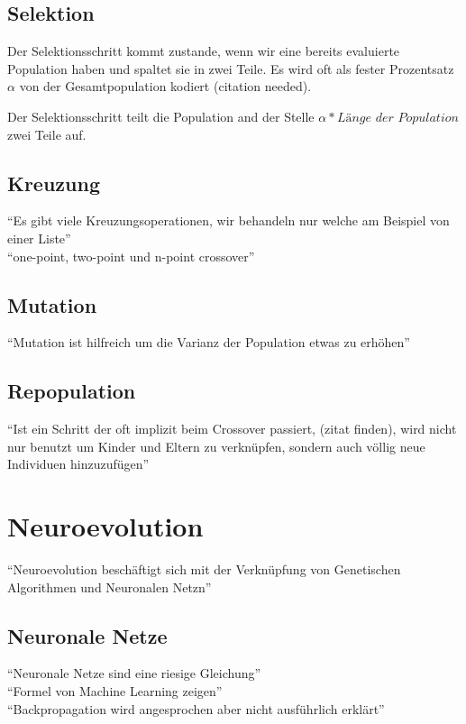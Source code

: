         \subsection{Selektion}

            Der Selektionsschritt kommt zustande, wenn wir eine bereits evaluierte Population haben und spaltet sie in zwei Teile. Es wird oft als fester Prozentsatz $\alpha$ von der Gesamtpopulation kodiert (citation needed).

            Der Selektionsschritt teilt die Population and der Stelle $\alpha * \textit{Länge der Population}$ zwei Teile auf.
        \subsection{Kreuzung}
            ``Es gibt viele Kreuzungsoperationen, wir behandeln nur welche am Beispiel von einer Liste'' \\
            ``one-point, two-point und n-point crossover''
        \subsection{Mutation}
            ``Mutation ist hilfreich um die Varianz der Population etwas zu erhöhen'' \\
        \subsection{Repopulation}
            ``Ist ein Schritt der oft implizit beim Crossover passiert, (zitat finden), wird nicht nur benutzt um Kinder und Eltern zu verknüpfen, sondern auch völlig neue Individuen hinzuzufügen''

    \section{Neuroevolution}
        ``Neuroevolution beschäftigt sich mit der Verknüpfung von Genetischen Algorithmen und Neuronalen Netzn''
        \subsection{Neuronale Netze}
                ``Neuronale Netze sind eine riesige Gleichung''\\
                ``Formel von Machine Learning zeigen'' \\
                ``Backpropagation wird angesprochen aber nicht ausführlich erklärt''\\
